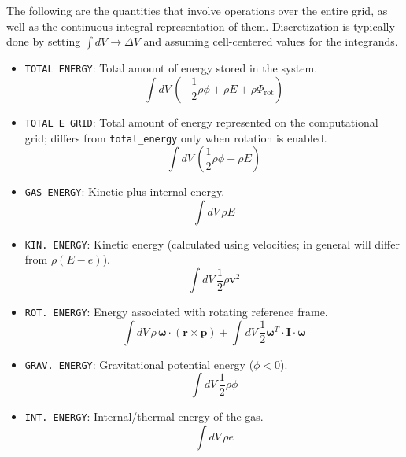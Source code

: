 \documentclass[12pt]{book}
\begin{document}
The following are the quantities that involve operations over the entire grid, as well as the continuous 
integral representation of them. Discretization is typically done by setting $\int dV \rightarrow \Delta V$ and 
assuming cell-centered values for the integrands.
\begin{itemize}
  \item \texttt{TOTAL ENERGY}: Total amount of energy stored in the system.
  \begin{equation}
    \int dV\, \left(-\frac{1}{2}\rho \phi + \rho E + \rho \Phi_{\text{rot}}\right)
  \end{equation}

  \item \texttt{TOTAL E GRID}: Total amount of energy represented on the computational grid; differs from
    \texttt{total\_energy} only when rotation is enabled.
  \begin{equation}
    \int dV\, \left(\frac{1}{2}\rho \phi + \rho E\right)
  \end{equation}

  \item \texttt{GAS ENERGY}: Kinetic plus internal energy.
  \begin{equation}
    \int dV\, \rho E
  \end{equation}

  \item \texttt{KIN. ENERGY}: Kinetic energy (calculated using velocities; in general will differ from $\rho(E - e)$).
  \begin{equation}
    \int dV\, \frac{1}{2} \rho \mathbf{v}^2
  \end{equation}

  \item \texttt{ROT. ENERGY}: Energy associated with rotating reference frame.
  \begin{equation}
    \int dV\, \rho\, {\bm \omega} \cdot (\mathbf{r} \times \mathbf{p}) + \int dV\, \frac{1}{2} {\bm \omega}^T \cdot \mathbf{I} \cdot {\bm \omega}
  \end{equation}

  \item \texttt{GRAV. ENERGY}: Gravitational potential energy ($\phi < 0$).
  \begin{equation}
    \int dV\, \frac{1}{2}\rho\phi
  \end{equation}

  \item \texttt{INT. ENERGY}: Internal/thermal energy of the gas.
  \begin{equation}
    \int dV\, \rho e
  \end{equation}


\end{itemize}
\end{document}
